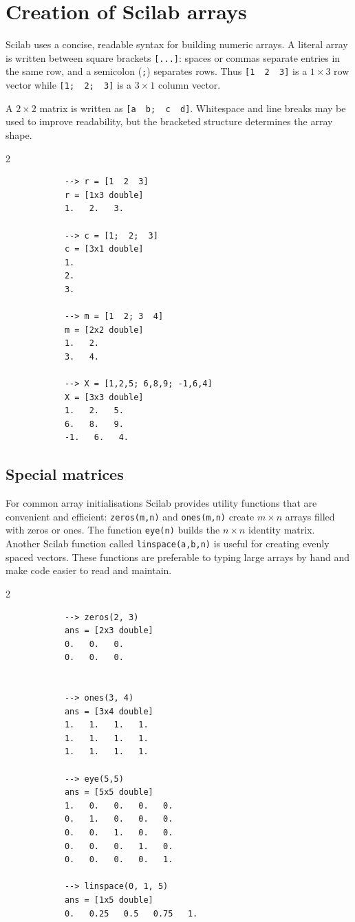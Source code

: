\section{Creation of Scilab arrays}
	Scilab uses a concise, readable syntax for building numeric arrays. A literal array is written between square brackets \verb|[...]|: spaces or commas separate entries in the same row, and a semicolon (\verb|;|) separates rows. Thus \verb|[1  2  3]| is a $1\times3$ row vector while \verb|[1;  2;  3]| is a $3\times1$ column vector.
	
	A $2\times2$ matrix is written as \verb|[a  b;  c  d]|. Whitespace and line breaks may be used to improve readability, but the bracketed structure determines the array shape.
	\begin{multicols}{2}
		\begin{verbatim}
			--> r = [1  2  3]
			r = [1x3 double]
			1.   2.   3.
			
			--> c = [1;  2;  3]
			c = [3x1 double]
			1.
			2.
			3.
			
			--> m = [1  2; 3  4]
			m = [2x2 double]
			1.   2.
			3.   4.
			
			--> X = [1,2,5; 6,8,9; -1,6,4]
			X = [3x3 double]
			1.   2.   5.
			6.   8.   9.
			-1.   6.   4.
		\end{verbatim}
	\end{multicols}
	
	\subsection{Special matrices}
	For common array initialisations Scilab provides utility functions that are convenient and efficient: \verb|zeros(m,n)| and \verb|ones(m,n)| create $m\times n$ arrays filled with zeros or ones. The function \verb|eye(n)| builds the $n\times n$ identity matrix. Another Scilab function called \verb|linspace(a,b,n)| is useful for creating evenly spaced vectors. These functions are preferable to typing large arrays by hand and make code easier to read and maintain.
	
	\begin{multicols}{2}
		\begin{verbatim}
			--> zeros(2, 3)
			ans = [2x3 double]
			0.   0.   0.
			0.   0.   0.
			
			
			--> ones(3, 4)
			ans = [3x4 double]
			1.   1.   1.   1.
			1.   1.   1.   1.
			1.   1.   1.   1.
			
			--> eye(5,5)
			ans = [5x5 double]
			1.   0.   0.   0.   0.
			0.   1.   0.   0.   0.
			0.   0.   1.   0.   0.
			0.   0.   0.   1.   0.
			0.   0.   0.   0.   1.
			
			--> linspace(0, 1, 5)
			ans = [1x5 double]
			0.   0.25   0.5   0.75   1.
		\end{verbatim}
	\end{multicols}